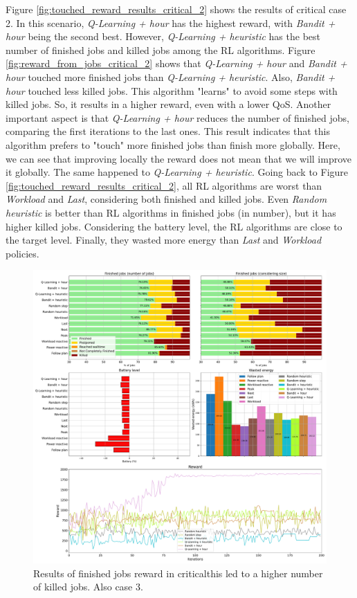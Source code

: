 Figure \ref{fig:touched_reward_results_critical_2} shows the results of critical case 2. In this scenario, \emph{Q-Learning + hour} has the highest reward, with \emph{Bandit + hour} being the second best. However, \emph{Q-Learning + heuristic} has the best number of finished jobs and killed jobs among the RL algorithms. Figure \ref{fig:reward_from_jobs_critical_2} shows that \emph{Q-Learning + hour} and \emph{Bandit + hour} touched more finished jobs than \emph{Q-Learning + heuristic}. Also, \emph{Bandit + hour} touched less killed jobs. This algorithm "learns" to avoid some steps with killed jobs. So, it results in a higher reward, even with a lower QoS. Another important aspect is that \emph{Q-Learning + hour} reduces the number of finished jobs, comparing the first iterations to the last ones. This result indicates that this algorithm prefers to "touch" more finished jobs than finish more globally. Here, we can see that improving locally the reward does not mean that we will improve it globally. The same happened to \emph{Q-Learning + heuristic}. Going back to Figure \ref{fig:touched_reward_results_critical_2}, all RL algorithms are worst than \emph{Workload} and \emph{Last}, considering both finished and killed jobs. Even \emph{Random heuristic} is better than RL algorithms in finished jobs (in number), but it has higher killed jobs. Considering the battery level, the RL algorithms are close to the target level. Finally, they wasted more energy than \emph{Last} and \emph{Workload} policies. 

\begin{figure}[!htb]
    \centering
    \includegraphics[scale=0.29]{Images/Learning_compensations/reward_finished_touched_profile_worst_workload_1_with_noise_state_delta.pdf}
    \caption{Results of finished jobs reward in criticalthis led to a higher number of killed jobs. Also case 3.}
    \label{fig:touched_reward_results_critical_3}
\end{figure}

